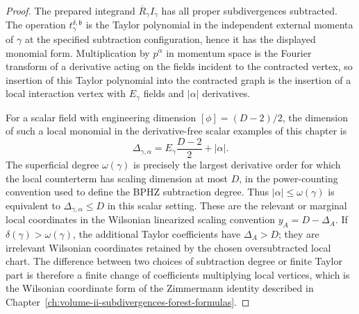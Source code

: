 \begin{proof}
The prepared integrand \(\overline R_\gamma I_\gamma\) has all proper
subdivergences subtracted.  The operation \(t_\gamma^{\delta,\mathfrak b}\)
is the Taylor polynomial in the independent external momenta of \(\gamma\) at
the specified subtraction configuration, hence it has the displayed monomial
form.  Multiplication by \(p^\alpha\) in momentum space is the Fourier
transform of a derivative acting on the fields incident to the contracted
vertex, so insertion of this Taylor polynomial into the contracted graph is
the insertion of a local interaction vertex with \(E_\gamma\) fields and
\(|\alpha|\) derivatives.

For a scalar field with engineering dimension \([\phi]=(D-2)/2\), the
dimension of such a local monomial in the derivative-free scalar examples of
this chapter is
\[
  \Delta_{\gamma,\alpha}
  =
  E_\gamma\frac{D-2}{2}+|\alpha|.
\]
The superficial degree \(\omega(\gamma)\) is precisely the largest derivative
order for which the local counterterm has scaling dimension at most \(D\), in
the power-counting convention used to define the BPHZ subtraction degree.
Thus \(|\alpha|\leq\omega(\gamma)\) is equivalent to
\(\Delta_{\gamma,\alpha}\leq D\) in this scalar setting.  These are the
relevant or marginal local coordinates in the Wilsonian linearized scaling
convention \(y_A=D-\Delta_A\).  If
\(\delta(\gamma)>\omega(\gamma)\), the additional Taylor coefficients have
\(\Delta_A>D\); they are irrelevant Wilsonian coordinates retained by the
chosen oversubtracted local chart.  The difference between two choices of
subtraction degree or finite Taylor part is therefore a finite change of
coefficients multiplying local vertices, which is the Wilsonian coordinate
form of the Zimmermann identity described in
Chapter~\ref{ch:volume-ii-subdivergences-forest-formulas}.
\end{proof}

